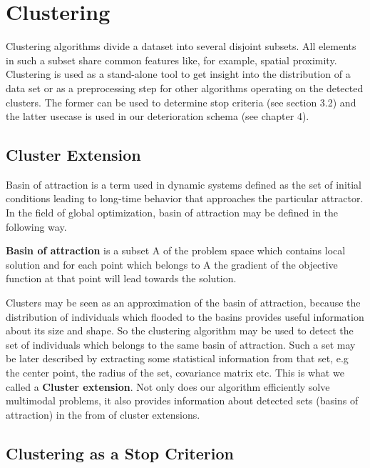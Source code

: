 
\chapter{Clustering}
\label{Clustering}

Clustering algorithms divide a dataset into several disjoint subsets. All elements in such
a subset share common features like, for example, spatial proximity.
Clustering is used as a stand-alone tool to get insight into the distribution
of a data set or as a preprocessing step for other algorithms operating on the
detected clusters. The former can be used to determine stop
criteria (see section 3.2) and the latter usecase is used in our deterioration
schema (see chapter 4).

\section{Cluster Extension}

Basin of attraction is a term used in dynamic systems
defined as the set of initial conditions leading to long-time 
behavior that approaches the particular attractor.
In the field of global optimization, basin of attraction may
be defined in the following way.

\begin{definition}\label{def:basin}
\textbf{Basin of attraction} is a subset A of the problem space which contains
local solution and for each point which belongs to A the gradient of the objective
function at that point will lead towards the solution.
\end{definition}

Clusters may be seen as an approximation of the basin of attraction, because
the distribution of individuals which flooded to the basins
provides useful information about its size and shape. So the clustering 
algorithm may be used to detect the set of individuals which belongs
to the same basin of attraction. Such a set may be later described by extracting
some statistical information from that set, e.g the center point,  
the radius of the set, covariance matrix etc. This is what we called
a \textbf{Cluster extension}. 
Not only does our algorithm efficiently solve multimodal problems, it also
provides information about detected sets (basins of attraction) in the from 
of cluster extensions. 

\section{Clustering as a Stop Criterion}

